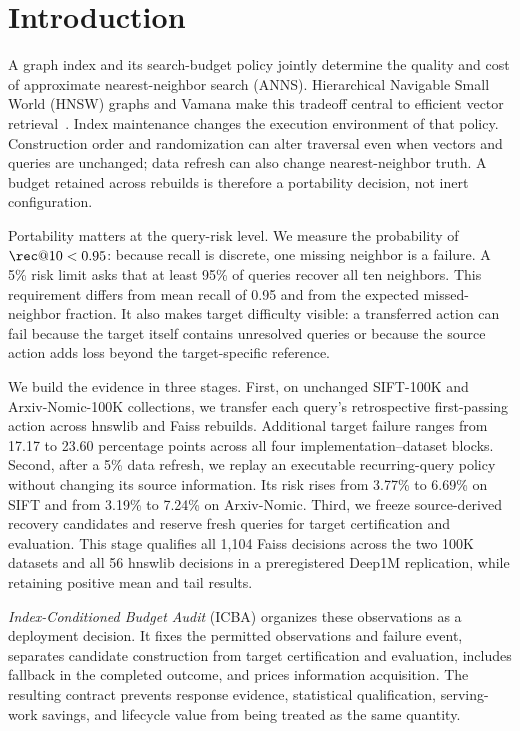 \section{Introduction}
\label{sec:intro}

A graph index and its search-budget policy jointly determine the quality and cost of approximate nearest-neighbor search (ANNS). Hierarchical Navigable Small World (HNSW) graphs and Vamana make this tradeoff central to efficient vector retrieval~\cite{malkov2020hnsw,subramanya2019diskann}. Index maintenance changes the execution environment of that policy. Construction order and randomization can alter traversal even when vectors and queries are unchanged; data refresh can also change nearest-neighbor truth. A budget retained across rebuilds is therefore a portability decision, not inert configuration.

Portability matters at the query-risk level. We measure the probability of $\rec@10<0.95$: because recall is discrete, one missing neighbor is a failure. A 5\% risk limit asks that at least 95\% of queries recover all ten neighbors. This requirement differs from mean recall of 0.95 and from the expected missed-neighbor fraction. It also makes target difficulty visible: a transferred action can fail because the target itself contains unresolved queries or because the source action adds loss beyond the target-specific reference.

We build the evidence in three stages. First, on unchanged SIFT-100K and Arxiv-Nomic-100K collections, we transfer each query's retrospective first-passing action across hnswlib and Faiss rebuilds. Additional target failure ranges from 17.17 to 23.60 percentage points across all four implementation--dataset blocks. Second, after a 5\% data refresh, we replay an executable recurring-query policy without changing its source information. Its risk rises from 3.77\% to 6.69\% on SIFT and from 3.19\% to 7.24\% on Arxiv-Nomic. Third, we freeze source-derived recovery candidates and reserve fresh queries for target certification and evaluation. This stage qualifies all 1,104 Faiss decisions across the two 100K datasets and all 56 hnswlib decisions in a preregistered Deep1M replication, while retaining positive mean and tail results.

\emph{Index-Conditioned Budget Audit} (ICBA) organizes these observations as a deployment decision. It fixes the permitted observations and failure event, separates candidate construction from target certification and evaluation, includes fallback in the completed outcome, and prices information acquisition. The resulting contract prevents response evidence, statistical qualification, serving-work savings, and lifecycle value from being treated as the same quantity.

